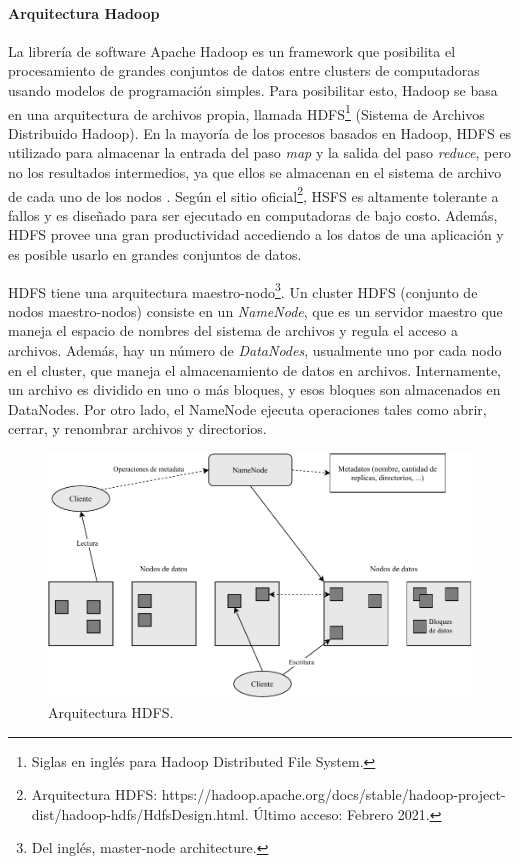 \paragraph{Arquitectura Hadoop}
La librería de software Apache Hadoop es un framework que posibilita el procesamiento de grandes conjuntos de datos entre clusters de computadoras usando modelos de programación simples. Para posibilitar esto, Hadoop se basa en una arquitectura de archivos propia, llamada HDFS\footnote{Siglas en inglés para Hadoop Distributed File System.} (Sistema de Archivos Distribuido Hadoop). En la mayoría de los procesos basados en Hadoop, HDFS es utilizado para almacenar la entrada del paso \textit{map} y la salida del paso \textit{reduce}, pero no los resultados intermedios, ya que ellos se almacenan en el sistema de archivo de cada uno de los nodos \citep{condie2010mapreduce}. Según el sitio oficial\footnote{Arquitectura HDFS: https://hadoop.apache.org/docs/stable/hadoop-project-dist/hadoop-hdfs/HdfsDesign.html. Último acceso: Febrero 2021.}, HSFS es altamente tolerante a fallos y es diseñado para ser ejecutado en computadoras de bajo costo. Además, HDFS provee una gran productividad accediendo a los datos de una aplicación y es posible usarlo en grandes conjuntos de datos.

\bigskip HDFS tiene una arquitectura maestro-nodo\footnote{Del inglés, master-node architecture.}. Un cluster HDFS (conjunto de nodos maestro-nodos) consiste en un \textit{NameNode}, que es un servidor maestro que maneja el espacio de nombres del sistema de archivos y regula el acceso a archivos. Además, hay un número de \textit{DataNodes}, usualmente uno por cada nodo en el cluster, que maneja el almacenamiento de datos en archivos. Internamente, un archivo es dividido en uno o más bloques, y esos bloques son almacenados en DataNodes. Por otro lado, el NameNode ejecuta operaciones tales como abrir, cerrar, y renombrar archivos y directorios.
\bigskip
\begin{figure}[h!]
	\centering
	\includegraphics[width=0.9\linewidth]{7_marco_teorico/imagenes/arquitectura_hdfs}
	\caption{Arquitectura HDFS.}
	\label{fig:arquitectura_hdfs}
\end{figure}

